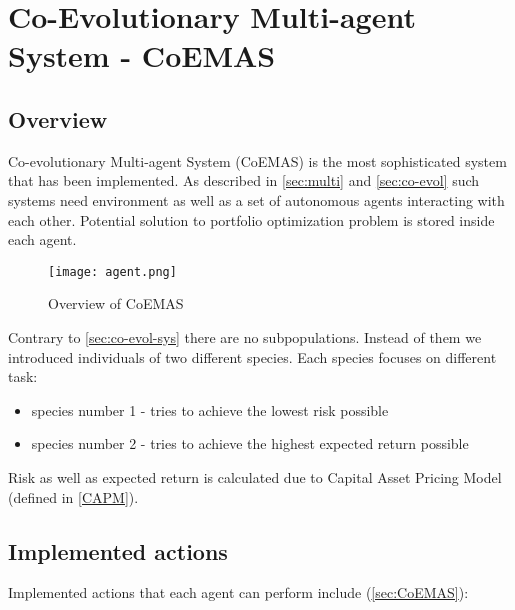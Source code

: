 \section{Co-Evolutionary Multi-agent System - CoEMAS}

\subsection{Overview}

Co-evolutionary Multi-agent System (CoEMAS) is the most sophisticated system that has been implemented.
As described in \ref{sec:multi} and \ref{sec:co-evol} such systems need environment as well as a set of autonomous agents interacting with each other.
Potential solution to portfolio optimization problem is stored inside each agent.


\begin{figure}[ht]   
	    \begin{center}
	      \texttt{[image: agent.png]}
	    \end{center}
	    \caption{Overview of CoEMAS} 
	  \end{figure}

Contrary to \ref{sec:co-evol-sys} there are no subpopulations.
Instead of them we introduced individuals of two different species.
Each species focuses on different task:

\begin{itemize}
  \item species number 1 - tries to achieve the lowest risk possible
  \item species number 2 - tries to achieve the highest expected return possible
\end{itemize}

Risk as well as expected return is calculated due to Capital Asset Pricing Model (defined in \ref{CAPM}).

\subsection{Implemented actions}

Implemented actions that each agent can perform include (\ref{sec:CoEMAS}):

